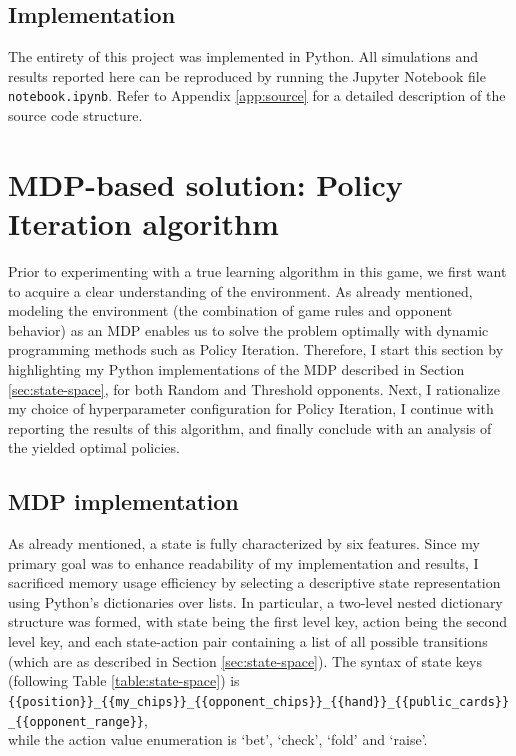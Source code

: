 \subsection{Implementation}

The entirety of this project was implemented in Python. All simulations and results reported here can be reproduced by running the Jupyter Notebook file \Verb|notebook.ipynb|. Refer to Appendix \ref{app:source} for a detailed description of the source code structure.

\section{MDP-based solution: Policy Iteration algorithm}

Prior to experimenting with a true learning algorithm in this game, we first want to acquire a clear understanding of the environment. As already mentioned, modeling the environment (the combination of game rules and opponent behavior) as an MDP enables us to solve the problem optimally with dynamic programming methods such as Policy Iteration. Therefore, I start this section by highlighting my Python implementations of the MDP described in Section \ref{sec:state-space}, for both Random and Threshold opponents. Next, I rationalize my choice of hyperparameter configuration for Policy Iteration, I continue with reporting the results of this algorithm, and finally conclude with an analysis of the yielded optimal policies.

\subsection{MDP implementation}

As already mentioned, a state is fully characterized by six features. Since my primary goal was to enhance readability of my implementation and results, I sacrificed memory usage efficiency by selecting a descriptive state representation using Python's dictionaries over lists. In particular, a two-level nested dictionary structure was formed, with state being the first level key, action being the second level key, and each state-action pair containing a list of all possible transitions (which are as described in Section \ref{sec:state-space}). The syntax of state keys (following Table \ref{table:state-space}) is {\small \Verb|{{position}}_{{my_chips}}_{{opponent_chips}}_{{hand}}_{{public_cards}}_{{opponent_range}}|}, \\ while the action value enumeration is `bet', `check', `fold' and `raise'.

